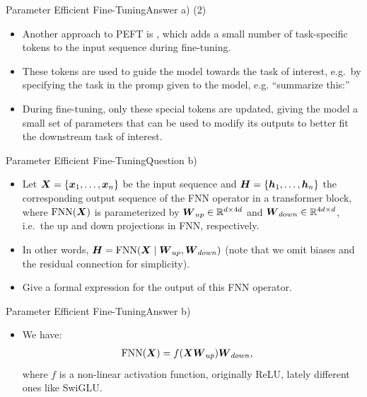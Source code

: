 \documentclass[t]{beamer}
\newcommand\op[1]{\operatorname{#1}}
\begin{document}
\begin{frame}{Parameter Efficient Fine-Tuning}{Answer a) (2)}
    \begin{itemize}
        \item Another approach to PEFT is , which adds a
              small number of task-specific tokens to the input sequence during
              fine-tuning.
        \item These tokens are used to guide the model towards the task of
              interest, e.g.\ by specifying the task in the promp given to the
              model, e.g. ``summarize this:''
        \item During fine-tuning, only these special tokens are updated, giving
              the model a small set of parameters that can be used to modify its
              outputs to better fit the downstream task of interest.
    \end{itemize}
\end{frame}

\begin{frame}{Parameter Efficient Fine-Tuning}{Question b)}
    \begin{itemize}
        \item Let ${\boldsymbol{X}} = \{{\boldsymbol{x}}_1,\ldots,{\boldsymbol{x}}_n\}$ be the input sequence and
              ${\boldsymbol{H}} = \{{\boldsymbol{h}}_1,\ldots, {\boldsymbol{h}}_n\}$ the corresponding output sequence
              of the FNN operator in a transformer block, where $\op{FNN}(\mX)$
              is parameterized by ${\boldsymbol{W}}_{up}\in\mathbb{R}^{d\times 4d}$ and
              ${\boldsymbol{W}}_{down}\in\mathbb{R}^{4d\times d}$, i.e.\ the up and down
              projections in FNN, respectively.
        \item In other words, $\mH = \op{FNN}(\mX\mid \mW_{up}, \mW_{down})$
              (note that we omit biases and the residual connection for
              simplicity).
        \item Give a formal expression for the output of this FNN operator.
    \end{itemize}
\end{frame}

\begin{frame}{Parameter Efficient Fine-Tuning}{Answer b)}
    \begin{itemize}
        \item We have:
              \begin{align}
                  \op{FNN}(\mX) & = f(\mX\mW_{up})\mW_{down},
              \end{align}
              where $f$ is a non-linear activation function, originally ReLU,
              lately different ones like SwiGLU.
    \end{itemize}
\end{frame}
\end{document}
